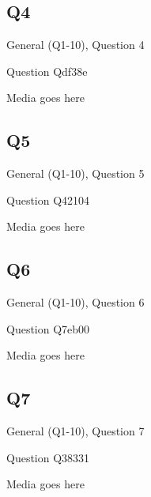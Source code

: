 \documentclass[11pt]{beamer}
\begin{document}
\subsection*{Q4}
\begin{frame}[t]{General (Q1-10), Question 4}
\vspace{2em}
\begin{block}{Question}
Qdf38e
\end{block}
\begin{center}
Media goes here
\end{center}
\end{frame}
    

\subsection*{Q5}
\begin{frame}[t]{General (Q1-10), Question 5}
\vspace{2em}
\begin{block}{Question}
Q42104
\end{block}
\begin{center}
Media goes here
\end{center}
\end{frame}
    

\subsection*{Q6}
\begin{frame}[t]{General (Q1-10), Question 6}
\vspace{2em}
\begin{block}{Question}
Q7eb00
\end{block}
\begin{center}
Media goes here
\end{center}
\end{frame}
    

\subsection*{Q7}
\begin{frame}[t]{General (Q1-10), Question 7}
\vspace{2em}
\begin{block}{Question}
Q38331
\end{block}
\begin{center}
Media goes here
\end{center}
\end{frame}
    
\end{document}
